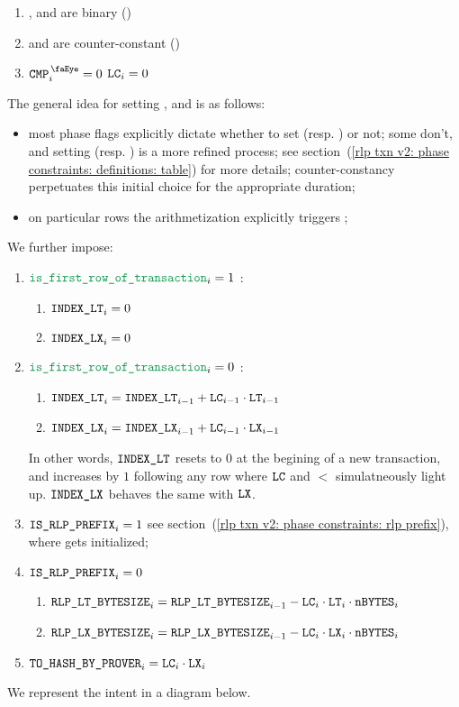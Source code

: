 \begin{enumerate}
    \item \lc{}, \lt{} and \lx{} are binary \quad (\sanityCheck)
    \item \lt{} and \lx{} are counter-constant \quad (\sanityCheck)
    \item \If $\isCmp  _{i} = 0$ \Then $\texttt{LC} _{i} = 0$
\end{enumerate}
\saNote{}
The general idea for setting \lc{}, \lt{} and \lx{} is as follows:
\begin{itemize}
    \item
        most phase flags explicitly dictate whether to set \lt{} (resp. \lx{}) or not;
        some don't, and setting \lt{} (resp. \lx{}) is a more refined process;
        see section~(\ref{rlp txn v2: phase constraints: definitions: table})
        for more details;
        counter-constancy perpetuates this initial choice for the appropriate duration;
    \item
        on particular rows the arithmetization explicitly triggers \lc{};
\end{itemize}

\noindent We further impose:
\begin{enumerate}
    \item \If $\locIsFirstRowOfTransaction _{i} = 1$ \Then:
        \begin{enumerate}
            \item $\texttt{INDEX\_LT} _{i} = 0$
            \item $\texttt{INDEX\_LX} _{i} = 0$
        \end{enumerate}
    \item \If $\locIsFirstRowOfTransaction _{i} = 0$ \Then:
        \begin{enumerate}
            \item $\texttt{INDEX\_LT} _{i} = \texttt{INDEX\_LT} _{i - 1} + \texttt{LC} _{i - 1} \cdot \texttt{LT} _{i - 1}$
            \item $\texttt{INDEX\_LX} _{i} = \texttt{INDEX\_LX} _{i - 1} + \texttt{LC} _{i - 1} \cdot \texttt{LX} _{i - 1}$
        \end{enumerate}
        \saNote{}
        In other words, $\texttt{INDEX\_LT}$ resets to $0$ at the begining of a new transaction,
        and increases by $1$ following any row where $\texttt{LC}$ and $\lt$ simulatneously light up.
        $\texttt{INDEX\_LX}$ behaves the same with $\texttt{LX}$.
    \item \If $\texttt{IS\_RLP\_PREFIX} _{i} = 1$ \Then
        see section~(\ref{rlp txn v2: phase constraints: rlp prefix}),
        where \phaseRlpPrefix{} gets initialized;
    \item \If $\texttt{IS\_RLP\_PREFIX} _{i} = 0$ \Then
        \begin{enumerate}
            \item $\texttt{RLP\_LT\_BYTESIZE} _{i} = \texttt{RLP\_LT\_BYTESIZE} _{i - 1} - \texttt{LC} _{i} \cdot \texttt{LT} _{i} \cdot\texttt{nBYTES} _{i}$
            \item $\texttt{RLP\_LX\_BYTESIZE} _{i} = \texttt{RLP\_LX\_BYTESIZE} _{i - 1} - \texttt{LC} _{i} \cdot \texttt{LX} _{i} \cdot\texttt{nBYTES} _{i}$
        \end{enumerate}
    \item $\texttt{TO\_HASH\_BY\_PROVER} _{i} = \texttt{LC} _{i} \cdot \texttt{LX} _{i}$
\end{enumerate}
We represent the intent in a diagram below.


